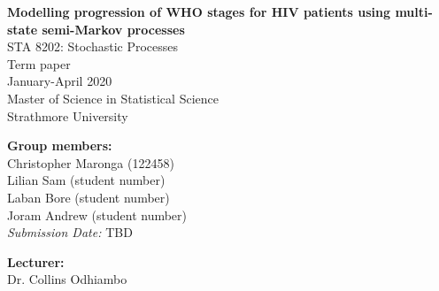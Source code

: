 \documentclass[11pt]{article}
\begin{document}
\clearpage\thispagestyle{empty}

\begin{center}
	\textbf{\huge{
	Modelling progression of WHO stages for HIV patients using multi-state semi-Markov processes
	}} \\[1.5cm]
	\Large{
	STA 8202: Stochastic Processes \\
	Term paper \\
	January-April 2020\\[0.5cm]
	Master of Science in Statistical Science\\
	Strathmore University	
	}
\end{center}

\vspace*{1cm}
\textbf{\large{Group members:}}\\
Christopher Maronga (122458) \\
Lilian Sam (student number) \\
Laban Bore (student number) \\
Joram Andrew (student number) \\[0.5cm]

\noindent\textit{Submission Date:} TBD

\vspace*{2.5cm}
\textbf{\large{Lecturer:}}\\
Dr. Collins Odhiambo 


\newpage \setcounter{page}{1}
\end{document}
